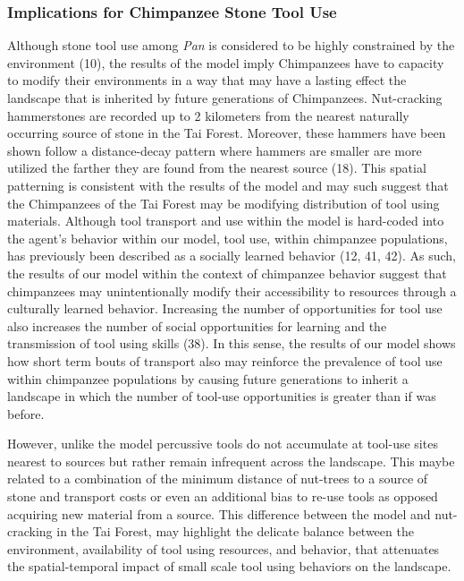 \documentclass[9pt,twocolumn,twoside,]{pnas-new}
\begin{document}
\hypertarget{implications-for-chimpanzee-stone-tool-use}{%
\subsubsection{Implications for Chimpanzee Stone Tool
Use}\label{implications-for-chimpanzee-stone-tool-use}}

Although stone tool use among \emph{Pan} is considered to be highly
constrained by the environment (10), the results of the model imply
Chimpanzees have to capacity to modify their environments in a way that
may have a lasting effect the landscape that is inherited by future
generations of Chimpanzees. Nut-cracking hammerstones are recorded up to
2 kilometers from the nearest naturally occurring source of stone in the
Tai Forest. Moreover, these hammers have been shown follow a
distance-decay pattern where hammers are smaller are more utilized the
farther they are found from the nearest source (18). This spatial
patterning is consistent with the results of the model and may such
suggest that the Chimpanzees of the Tai Forest may be modifying
distribution of tool using materials. Although tool transport and use
within the model is hard-coded into the agent's behavior within our
model, tool use, within chimpanzee populations, has previously been
described as a socially learned behavior (12, 41, 42). As such, the
results of our model within the context of chimpanzee behavior suggest
that chimpanzees may unintentionally modify their accessibility to
resources through a culturally learned behavior. Increasing the number
of opportunities for tool use also increases the number of social
opportunities for learning and the transmission of tool using skills
(38). In this sense, the results of our model shows how short term bouts
of transport also may reinforce the prevalence of tool use within
chimpanzee populations by causing future generations to inherit a
landscape in which the number of tool-use opportunities is greater than
if was before.

However, unlike the model percussive tools do not accumulate at tool-use
sites nearest to sources but rather remain infrequent across the
landscape. This maybe related to a combination of the minimum distance
of nut-trees to a source of stone and transport costs or even an
additional bias to re-use tools as opposed acquiring new material from a
source. This difference between the model and nut-cracking in the Tai
Forest, may highlight the delicate balance between the environment,
availability of tool using resources, and behavior, that attenuates the
spatial-temporal impact of small scale tool using behaviors on the
landscape.
\end{document}
